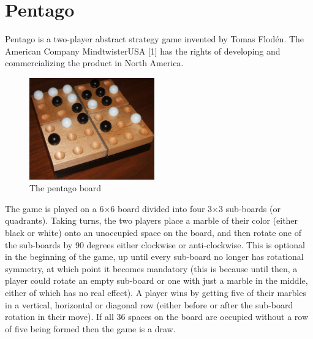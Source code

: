 \section{Pentago}
\label{Pentago}
Pentago is a two-player abstract strategy game invented by Tomas Flodén. The American Company MindtwisterUSA [1] has the rights of developing and commercializing the product in North America. %


\begin{figure}
  \begin{center}
    \includegraphics[width=0.48\textwidth]{Images/Pentago-Game-Winning-Position.jpg}
  \end{center}
  \caption{The pentago board}
  \label{fig:boardpic}
\end{figure}

The game is played on a 6×6 board divided into four 3×3 sub-boards (or quadrants). Taking turns, the two players place a marble of their color (either black or white) onto an unoccupied space on the board, and then rotate one of the sub-boards by 90 degrees either clockwise or anti-clockwise. This is optional in the beginning of the game, up until every sub-board no longer has rotational symmetry, at which point it becomes mandatory (this is because until then, a player could rotate an empty sub-board or one with just a marble in the middle, either of which has no real effect). A player wins by getting five of their marbles in a vertical, horizontal or diagonal row (either before or after the sub-board rotation in their move). If all 36 spaces on the board are occupied without a row of five being formed then the game is a draw. %
